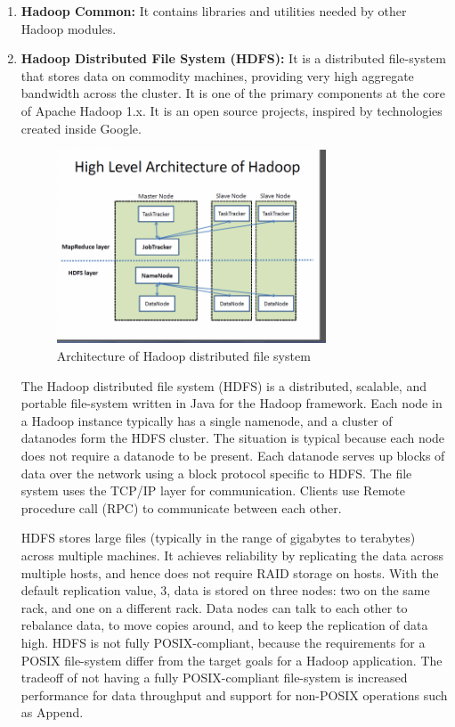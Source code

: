 \documentclass[conference]{IEEEtran}
\begin{document}
\begin{enumerate}
        \item \textbf{Hadoop Common:}
                It contains libraries and utilities needed by other Hadoop modules.
        \item \textbf{Hadoop Distributed File System (HDFS):}
It is a distributed file-system that stores data on commodity machines, providing very high aggregate bandwidth across the cluster.
It is one of the primary components at the core of Apache Hadoop 1.x. It is an open source projects, inspired by technologies created inside Google.
\begin{figure}[h!]
        \centering
        \includegraphics[width=80mm]{hdfs}
        \caption{Architecture of Hadoop distributed file system}
\end{figure}
The Hadoop distributed file system (HDFS) is a distributed, scalable, and portable file-system written in 
Java for the Hadoop framework. Each node in a Hadoop instance typically has a single namenode, and a cluster
of datanodes form the HDFS cluster. The situation is typical because each node does not require a datanode
to be present. Each datanode serves up blocks of data over the network using a block protocol specific to
HDFS. The file system uses the TCP/IP layer for communication. Clients use Remote procedure call (RPC) to
communicate between each other.\\
\par HDFS stores large files (typically in the range of gigabytes to terabytes) across multiple machines. It achieves reliability by replicating the data across multiple hosts, and hence does not require RAID storage on hosts. With the default replication value, 3, data is stored on three nodes: two on the same rack, and one on a different rack. Data nodes can talk to each other to rebalance data, to move copies around, and to keep the replication of data high. HDFS is not fully POSIX-compliant, because the requirements for a POSIX file-system differ from the target goals for a Hadoop application. The tradeoff of not having a fully POSIX-compliant file-system is increased performance for data throughput and support for non-POSIX operations such as Append.

\end{enumerate}
\end{document}
